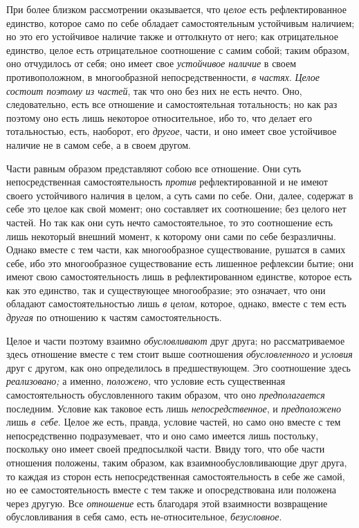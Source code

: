 При более близком рассмотрении оказывается, что
{\em целое} есть рефлектированное единство, которое
само по себе обладает самостоятельным устойчивым наличием; но это его
устойчивое наличие также и оттолкнуто от него; как отрицательное единство,
целое есть отрицательное соотношение с самим собой; таким образом, оно
отчудилось от себя; оно имеет свое {\em устойчивое
наличие} в своем противоположном, в многообразной непосредственности,
{\em в частях}. {\em Целое состоит
поэтому из частей}, так что оно без них не есть нечто. Оно, следовательно,
есть все отношение и самостоятельная тотальность; но как раз поэтому оно
есть лишь некоторое относительное, ибо то, что делает его тотальностью,
есть, наоборот, его {\em другое}, части, и оно имеет
свое устойчивое наличие не в самом себе, а в своем другом.

Части равным образом представляют собою все отношение. Они суть
непосредственная самостоятельность {\em против}
рефлектированной и не имеют своего устойчивого наличия в целом, а суть сами
по себе. Они, далее, содержат в себе это целое как свой момент; оно
составляет их соотношение; без целого нет частей. Но так как они суть нечто
самостоятельное, то это соотношение есть лишь некоторый внешний момент, к
которому они сами по себе безразличны. Однако вместе с тем части, как
многообразное существование, рушатся в самих себе, ибо это многообразное
существование есть лишенное рефлексии бытие; они имеют свою
самостоятельность лишь в рефлектированном единстве, которое есть как это
единство, так и существующее многообразие; это означает, что они обладают
самостоятельностью лишь {\em в целом}, которое, однако,
вместе с тем есть {\em другая} по отношению к частям самостоятельность.

Целое и части поэтому взаимно {\em обусловливают} друг
друга; но рассматриваемое здесь отношение вместе с тем стоит выше
соотношения {\em обусловленного} и
{\em условия} друг с другом, как оно определилось в
предшествующем. Эго соотношение здесь {\em реализовано;} а именно,
{\em положено}, что условие есть существенная
самостоятельность обусловленного таким образом, что оно
{\em предполагается} последним. Условие как таковое
есть лишь {\em непосредственное}, и {\em предположено} лишь
{\em в~себе}. Целое же есть, правда, условие частей, но само оно вместе
с тем непосредственно подразумевает, что и оно само имеется лишь постольку,
поскольку оно имеет своей предпосылкой части. Ввиду того, что обе части
отношения положены, таким образом, как взаимнообусловливающие друг друга,
то каждая из сторон есть непосредственная самостоятельность в себе же
самой, но ее самостоятельность вместе с тем также и опосредствована или
положена через другую. Все {\em отношение} есть
благодаря этой взаимности возвращение обусловливания в себя само, есть
не-относительное, {\em безусловное}.

